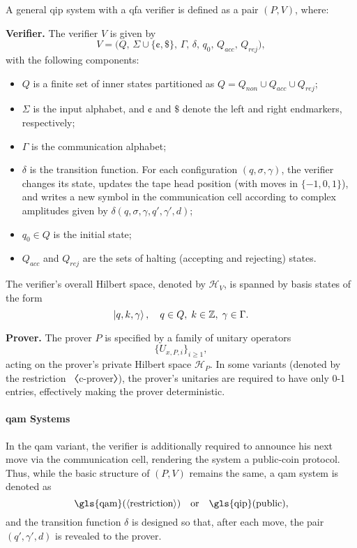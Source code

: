\begin{definition}
A general \gls{qip} system with a qfa verifier is defined as a pair $(P,V)$, where:

\textbf{Verifier.} The verifier $V$ is given by
\[
V = \bigl(Q,\, \Sigma \cup \{\cent,\$\},\, \Gamma,\, \delta,\, q_0,\, Q_{acc},\, Q_{rej}\bigr),
\]
with the following components:
\begin{itemize}
  \item $Q$ is a finite set of inner states partitioned as $Q = Q_{non} \cup Q_{acc} \cup Q_{rej}$;
  \item $\Sigma$ is the input alphabet, and $\cent$ and $\$$ denote the left and right endmarkers, respectively;
  \item $\Gamma$ is the communication alphabet;
  \item $\delta$ is the transition function. For each configuration $(q,\sigma,\gamma)$, the verifier changes its state, updates the tape head position (with moves in $\{-1,0,1\}$), and writes a new symbol in the communication cell according to complex amplitudes given by $\delta(q,\sigma,\gamma,q',\gamma',d)$;
  \item $q_0\in Q$ is the initial state;
  \item $Q_{acc}$ and $Q_{rej}$ are the sets of halting (accepting and rejecting) states.
\end{itemize}
The verifier's overall Hilbert space, denoted by $\mathit{\mathcal{H}}_V$, is spanned by basis states of the form
\[
\ket{q, k, \gamma},\quad q\in Q,\; k\in \mathbb{Z},\; \gamma\in\Gamma.
\]

\textbf{Prover.} The prover $P$ is specified by a family of unitary operators
\[
\{U_{x,P,i}\}_{i\ge1},
\]
acting on the prover's private Hilbert space $\mathit{\mathcal{H}}_P$. In some variants (denoted by the restriction 〈c-prover〉), the prover's unitaries are required to have only 0-1 entries, effectively making the prover deterministic.
\end{definition}

\paragraph{\gls{qam} Systems} In the \gls{qam} variant, the verifier is additionally required to announce his next move via the communication cell, rendering the system a public-coin protocol. Thus, while the basic structure of $(P,V)$ remains the same, a \gls{qam} system is denoted as
\[
\text{\gls{qam}}(\langle\text{restriction}\rangle) \quad \text{or} \quad \text{\gls{qip}}(\text{public}),
\]
and the transition function $\delta$ is designed so that, after each move, the pair $(q',\gamma',d)$ is revealed to the prover.

